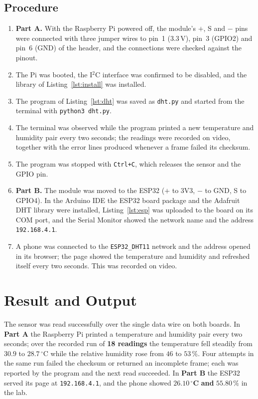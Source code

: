 \documentclass[10pt,a4paper]{article}
\begin{document}
\subsection{Procedure}
\begin{enumerate}
  \item \textbf{Part A.} With the Raspberry Pi powered off, the module's $+$, S and $-$
        pins were connected with three jumper wires to pin~1 ($3.3\,\mathrm{V}$), pin~3
        (GPIO2) and pin~6 (GND) of the header, and the connections were checked against
        the pinout.
  \item The Pi was booted, the I$^2$C interface was confirmed to be disabled, and the
        library of Listing~\ref{lst:install} was installed.
  \item The program of Listing~\ref{lst:dht} was saved as \texttt{dht.py} and started
        from the terminal with \texttt{python3 dht.py}.
  \item The terminal was observed while the program printed a new temperature and
        humidity pair every two seconds; the readings were recorded on video, together
        with the error lines produced whenever a frame failed its checksum.
  \item The program was stopped with \texttt{Ctrl+C}, which releases the sensor and
        the GPIO pin.
  \item \textbf{Part B.} The module was moved to the ESP32 ($+$ to 3V3, $-$ to GND,
        S to GPIO4). In the Arduino IDE the ESP32 board package and the Adafruit DHT
        library were installed, Listing~\ref{lst:esp} was uploaded to the board on its
        COM port, and the Serial Monitor showed the network name and the address
        \texttt{192.168.4.1}.
  \item A phone was connected to the \texttt{ESP32\_DHT11} network and the address
        opened in its browser; the page showed the temperature and humidity and
        refreshed itself every two seconds. This was recorded on video.
\end{enumerate}






\section{Result and Output}

\begin{keybox}
The sensor was read successfully over the single data wire on both boards. In
\textbf{Part A} the Raspberry Pi printed a temperature and humidity pair every two
seconds; over the recorded run of \textbf{18 readings} the temperature fell steadily
from $30.9$ to $28.7\,^{\circ}\mathrm{C}$ while the relative humidity rose from $46$ to
$53\,\%$. Four attempts in the same run failed the checksum or returned an incomplete
frame; each was reported by the program and the next read succeeded. In
\textbf{Part B} the ESP32 served its page at \texttt{192.168.4.1}, and the phone showed
$\mathbf{26.10\,^{\circ}C}$ \textbf{and} $\mathbf{55.80\,\%}$ in the lab.
\end{keybox}
\end{document}

